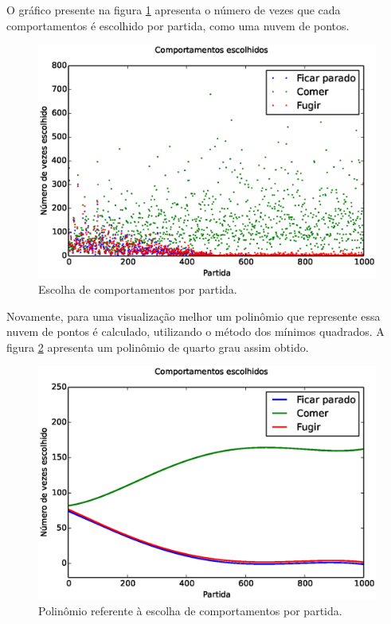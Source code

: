 O gráfico presente na figura \ref{img:3ComportamentosMapaOriginal:ComportamentosEscolhidos} apresenta o número de vezes que cada comportamentos é escolhido por partida, como uma nuvem de pontos.

\begin{figure}[h]
    \centering
    \includegraphics[width=150mm]{images/3_behaviors_original_map/chosen_behaviors}
    \caption{Escolha de comportamentos por partida.}
    \label{img:3ComportamentosMapaOriginal:ComportamentosEscolhidos}
\end{figure}

Novamente, para uma visualização melhor um polinômio que represente essa nuvem de pontos é calculado, utilizando o método dos mínimos quadrados. A figura \ref{img:3ComportamentosMapaOriginal:ComportamentosEscolhidosPolinômio} apresenta um polinômio de quarto grau assim obtido.

\begin{figure}[H]
    \centering
    \includegraphics[width=145mm]{images/3_behaviors_original_map/chosen_behaviors_pol}
    \caption{Polinômio referente à escolha de comportamentos por partida.}
    \label{img:3ComportamentosMapaOriginal:ComportamentosEscolhidosPolinômio}
\end{figure}

